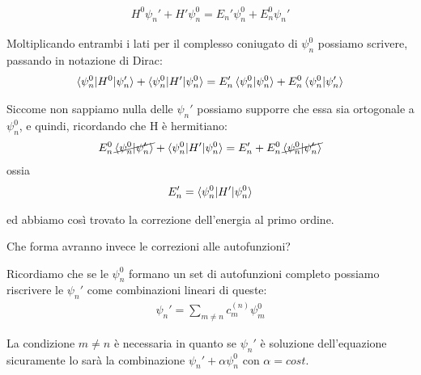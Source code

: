 \begin{align}
H^0\psi_n' + H'\psi_n^0= E_n'\psi_n^0 + E_n^0\psi_n' 
\end{align}

Moltiplicando entrambi i lati per il complesso coniugato di $\psi_n^0$ possiamo scrivere, passando in notazione di Dirac:
\begin{align}
\braket{\psi_n^0 |H^0|\psi_n'} + \braket{\psi_n^0 |H'|\psi_n^0} = E_n'\braket{\psi_n^0|\psi_n^0} + E_n^0 \braket{\psi_n^0|\psi_n'}
\end{align}

Siccome non sappiamo nulla delle $\psi_n'$ possiamo supporre che essa sia ortogonale a $\psi_n^0$, e quindi, ricordando che H è hermitiano:
\begin{align}
E_n^0 \, \cancel{\braket{\psi_n^0 |\psi_n'}}+ \braket{\psi_n^0 |H'|\psi_n^0}= E_n' + E_n^0 \, \cancel{\braket{\psi_n^0 |\psi_n'}}
\end{align}
ossia
\begin{align}
E_n'=\braket{\psi_n^0 |H'|\psi_n^0}
\end{align}

ed abbiamo così trovato la correzione dell'energia  al primo ordine.

Che forma avranno invece le correzioni alle autofunzioni?

Ricordiamo che se le $\psi_n^0$ formano un set di autofunzioni completo possiamo riscrivere le $\psi_n'$ come combinazioni lineari di queste:
\begin{align}
\psi_n'= \sum_{m\neq n}c_m^{(n)}\psi_m^0
\end{align}

La condizione $m\neq n$ è necessaria in quanto se $\psi_n'$ è soluzione dell'equazione sicuramente lo sarà la combinazione $\psi_n' + \alpha \psi_n^0$ con $\alpha=cost.$

\newpage

